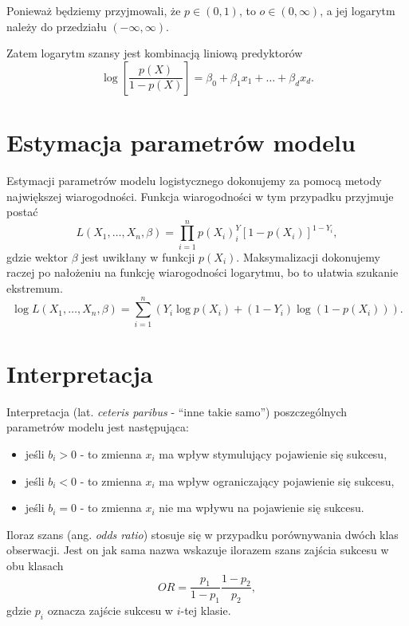 \documentclass[
]{book}
\providecommand{\tightlist}{%
  \setlength{\itemsep}{0pt}\setlength{\parskip}{0pt}}
\theoremstyle{plain}
\theoremstyle{definition}
\theoremstyle{definition}
\theoremstyle{definition}
\theoremstyle{definition}
\theoremstyle{definition}
\theoremstyle{remark}
\begin{document}
Ponieważ będziemy przyjmowali, że \(p\in (0,1)\), to \(o\in (0,\infty)\), a jej logarytm należy do przedziału \((-\infty, \infty)\).

Zatem logarytm szansy jest kombinacją liniową predyktorów
\begin{equation}
    \log\left[\frac{p(X)}{1-p(X)}\right]=\beta_0+\beta_1x_1+\ldots+\beta_dx_d.
\end{equation}

\section{Estymacja parametrów modelu}\label{estymacja-parametruxf3w-modelu}

Estymacji parametrów modelu logistycznego dokonujemy za pomocą metody największej wiarogodności. Funkcja wiarogodności w tym przypadku przyjmuje postać
\begin{equation}
    L(X_1,\ldots,X_n,\beta)=\prod_{i=1}^{n}p(X_i)^Y_i[1-p(X_i)]^{1-Y_i},
\end{equation}
gdzie wektor \(\beta\) jest uwikłany w funkcji \(p(X_i)\). Maksymalizacji dokonujemy raczej po nałożeniu na funkcję wiarogodności logarytmu, bo to ułatwia szukanie ekstremum.
\begin{equation}
    \log L(X_1,\ldots,X_n,\beta) = \sum_{i=1}^n(Y_i\log p(X_i)+(1-Y_i)\log(1-p(X_i))).
\end{equation}

\section{Interpretacja}\label{interpretacja}

Interpretacja (lat. \emph{ceteris paribus} - ``inne takie samo'') poszczególnych parametrów modelu jest następująca:

\begin{itemize}
\tightlist
\item
  jeśli \(b_i>0\) - to zmienna \(x_i\) ma wpływ stymulujący pojawienie się sukcesu,
\item
  jeśli \(b_i<0\) - to zmienna \(x_i\) ma wpływ ograniczający pojawienie się sukcesu,
\item
  jeśli \(b_i=0\) - to zmienna \(x_i\) nie ma wpływu na pojawienie się sukcesu.
\end{itemize}

Iloraz szans (ang. \emph{odds ratio}) stosuje się w przypadku porównywania dwóch klas obserwacji. Jest on jak sama nazwa wskazuje ilorazem szans zajścia sukcesu w obu klasach
\begin{equation}
    OR = \frac{p_1}{1-p_1}\frac{1-p_2}{p_2},
\end{equation}
gdzie \(p_i\) oznacza zajście sukcesu w \(i\)-tej klasie.
\end{document}
